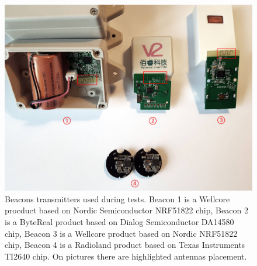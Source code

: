 \documentclass[../main.tex]{subfiles}
\begin{document}
\begin{figure}[ht]
\includegraphics[width=\textwidth, keepaspectratio]{pictures/beacons_used_in_tests.pdf}
\centering
\caption{Beacons transmitters used during tests. Beacon 1 is a Wellcore procduct based on Nordic Semiconductor NRF51822 chip, Beacon 2 is a ByteReal product based on Dialog Semiconductor DA14580 chip, Beacon 3 is a Wellcore product based on Nordic NRF51822 chip, Beacon 4 is a Radioland product based on Texas Instruments TI2640 chip. On pictures there are highlighted antennas placement.}
\label{fig:beacons_used_in_tests}
\end{figure}
\end{document}
